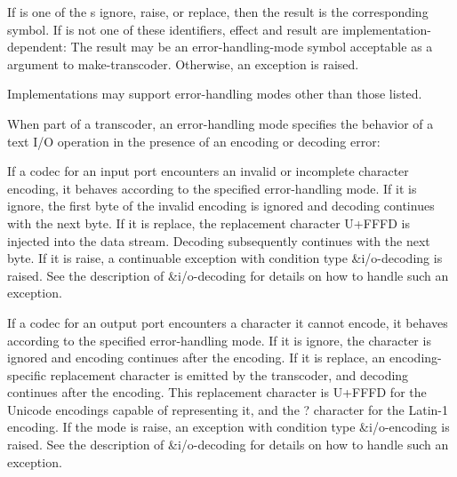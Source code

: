 \begin{entry}{%
}

If  is one of the s {\cf ignore}, {\cf
  raise}, or {\cf replace}, then the result is the corresponding
symbol.  If  is not one of these identifiers, effect and
result are implementation-dependent: The result may be an
error-handling-mode symbol acceptable as a 
argument to {\cf make-transcoder}.  Otherwise, an exception is raised.

\begin{rationale}
  Implementations may support error-handling modes other than those
  listed.
\end{rationale}

When part of a transcoder, an error-handling mode specifies the behavior
of a text I/O operation in the presence of an encoding or decoding
error:

If a codec for an input port encounters an invalid or incomplete
character encoding, it behaves according to the specified
error-handling mode. If it is {\cf ignore}, the first byte of the
invalid encoding is ignored and decoding continues with the next
byte.  If it is {\cf replace}, the replacement character U+FFFD is
injected into the data stream.  Decoding subsequently continues
with the next byte. If it is {\cf raise}, a continuable exception with
condition type {\cf\&i/o-decoding} is raised.  See the description of
{\cf\&i/o-decoding} for details
on how to handle such an exception.

If a codec for an output port encounters a character it cannot encode,
it behaves according to the specified error-handling mode. If it
is {\cf ignore}, the character is ignored and encoding continues after
the encoding. If it is {\cf replace}, an encoding-specific replacement
character is emitted by the transcoder, and decoding continues
after the encoding. This replacement character is U+FFFD for the
Unicode encodings capable of representing it, and the {\cf ?}
character for the Latin-1 encoding. If the mode is {\cf raise}, an
exception with condition type {\cf\&i/o-encoding} is raised.
See the description of
{\cf\&i/o-decoding} for details
on how to handle such an exception.
\end{entry}

